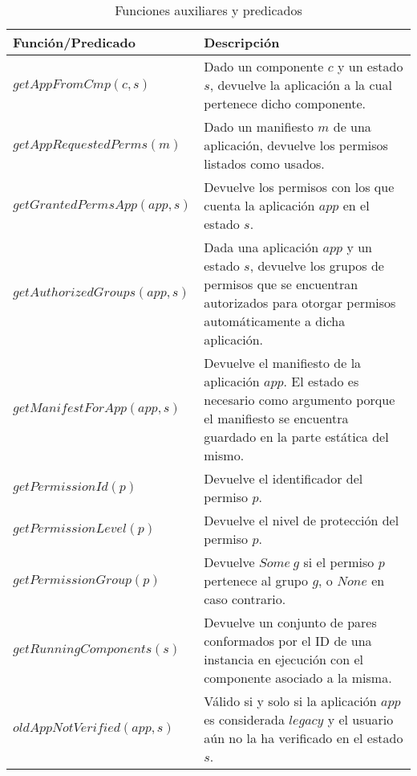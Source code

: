 \begin{table}[thb!]
    \centering
    \begin{tabularx}{\linewidth}{|l X|}
        \hline
        \textbf{Función/Predicado}   & \textbf{Descripción}                                                                                                                                               \\
        \hline
        $getAppFromCmp(c,s)$         & Dado un componente $c$ y un estado $s$, devuelve la aplicación a la cual pertenece dicho componente.                                                               \\
        \hline
        $getAppRequestedPerms(m)$    & Dado un manifiesto $m$ de una aplicación, devuelve los permisos listados como usados.                                                                              \\
        \hline
        $getGrantedPermsApp(app,s)$  & Devuelve los permisos con los que cuenta la aplicación $app$ en el estado $s$.                                                                                     \\
        \hline
        $getAuthorizedGroups(app,s)$ & Dada una aplicación $app$ y un estado $s$, devuelve los grupos de permisos que se encuentran autorizados para otorgar permisos automáticamente a dicha aplicación. \\
        \hline
        $getManifestForApp(app,s)$   & Devuelve el manifiesto de la aplicación $app$. El estado es necesario
        como argumento porque el manifiesto se encuentra guardado en la parte estática del mismo.                                                                                                         \\
        \hline
        $getPermissionId(p)$         & Devuelve el identificador del permiso $p$.                                                                                                                         \\
        \hline
        $getPermissionLevel(p)$      & Devuelve el nivel de protección del permiso $p$.                                                                                                                   \\
        \hline
        $getPermissionGroup(p)$      & Devuelve $Some~g$ si el permiso $p$ pertenece al grupo $g$, o $None$ en caso contrario.                                                                            \\
        \hline
        $getRunningComponents(s)$    & Devuelve un conjunto de pares conformados por el ID de una instancia en ejecución con el componente asociado a la misma.                                           \\
        \hline
        $oldAppNotVerified(app,s)$   & Válido si y solo si la aplicación $app$ es considerada $legacy$ y el usuario aún no la ha verificado en el estado $s$.                                               \\
        \hline
    \end{tabularx}
    \caption{Funciones auxiliares y predicados}
    \label{table:auxiliary_functions}
\end{table}
